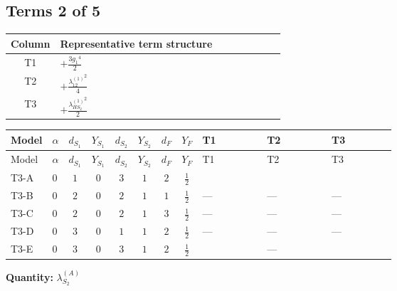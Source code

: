 \documentclass[8pt]{article}
\begin{document}
\begin{landscape}
\subsection*{Terms 2 of 5}
\begin{center}
\begin{tabular}{@{}c >{\raggedright\arraybackslash}p{0.82\linewidth}@{}}
\toprule
Column & Representative term structure \\
\midrule
T1 & \(\displaystyle +\frac{3 {g_1}^4}{2}\) \\
\midrule
T2 & \(\displaystyle +\frac{{\lambda_{12}^{(1)}}^2}{4}\) \\
\midrule
T3 & \(\displaystyle +\frac{{\lambda_{HS_2}^{(1)}}^2}{2}\) \\
\midrule
\bottomrule
\end{tabular}
\end{center}
\smallskip
\tiny
\begin{longtable}{@{}llcccccc >{\raggedright\arraybackslash}p{0.21\linewidth} >{\raggedright\arraybackslash}p{0.21\linewidth} >{\raggedright\arraybackslash}p{0.21\linewidth}@{}}
\toprule
Model & $\alpha$ & $d_{S_1}$ & $Y_{S_1}$ & $d_{S_2}$ & $Y_{S_2}$ & $d_F$ & $Y_F$ & T1 & T2 & T3 \\
\midrule
\endfirsthead
\toprule
Model & $\alpha$ & $d_{S_1}$ & $Y_{S_1}$ & $d_{S_2}$ & $Y_{S_2}$ & $d_F$ & $Y_F$ & T1 & T2 & T3 \\
\midrule
\endhead
T3-A & $0$ & $1$ & $0$ & $3$ & $1$ & $2$ & $\frac{1}{2}$ & \scriptsize\adjustbox{max width=\linewidth}{$\begin{gathered} +\frac{3 {g_1}^4}{2}\end{gathered}$} & \scriptsize\adjustbox{max width=\linewidth}{$\begin{gathered} +\frac{{\lambda_{12}^{(1)}}^2}{4}\end{gathered}$} & \scriptsize\adjustbox{max width=\linewidth}{$\begin{gathered} +\frac{{\lambda_{HS_2}^{(1)}}^2}{2}\end{gathered}$} \\
\midrule
T3-B & $0$ & $2$ & $0$ & $2$ & $1$ & $1$ & $\frac{1}{2}$ & --- & --- & --- \\
\midrule
T3-C & $0$ & $2$ & $0$ & $2$ & $1$ & $3$ & $\frac{1}{2}$ & --- & --- & --- \\
\midrule
T3-D & $0$ & $3$ & $0$ & $1$ & $1$ & $2$ & $\frac{1}{2}$ & --- & --- & --- \\
\midrule
T3-E & $0$ & $3$ & $0$ & $3$ & $1$ & $2$ & $\frac{1}{2}$ & \scriptsize\adjustbox{max width=\linewidth}{$\begin{gathered} +\frac{3 {g_1}^4}{2}\end{gathered}$} & --- & \scriptsize\adjustbox{max width=\linewidth}{$\begin{gathered} +\frac{{\lambda_{HS_2}^{(1)}}^2}{2}\end{gathered}$} \\
\midrule
\bottomrule
\end{longtable}
\clearpage
\noindent\textbf{Quantity: }$\lambda_{S_2}^{(A)}$\par\smallskip

\end{landscape}
\end{document}
